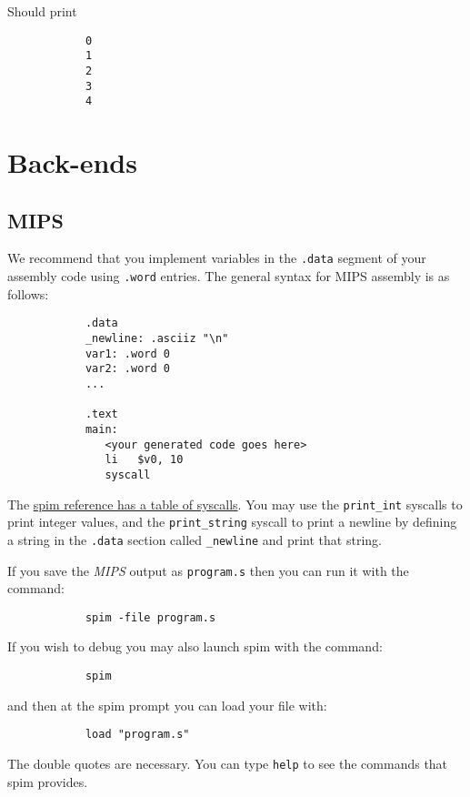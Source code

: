 \documentclass{article}
\newcommand{\code}[1]{\texttt{\textmd{#1}}}
\begin{document}
		Should print

		\begin{lstlisting}
			0
			1
			2
			3
			4
		\end{lstlisting}
	
\section{Back-ends}	
	
	\subsection{MIPS}

		We recommend that you implement variables in the \code{.data} segment of your assembly code using \code{.word} entries. The
		general syntax for MIPS assembly is as follows:

		\begin{lstlisting}
			.data
			_newline: .asciiz "\n"
			var1: .word 0
			var2: .word 0
			...
			
			.text
			main:
			   <your generated code goes here>
			   li   $v0, 10
			   syscall
		\end{lstlisting}
		
		The \href{https://www.cs.tcd.ie/\string~waldroj/itral/spim_ref.html}{spim reference has a table of syscalls}.
		You may use the \texttt{print\_int} syscalls to print integer values, and the \texttt{print\_string} syscall to
		print a newline by defining a string in the \texttt{.data} section called \texttt{\_newline} and print that
		string.
		
		If you save the \textit{MIPS} output as \code{program.s} then you can run it with the command:
		
		\begin{lstlisting}
			spim -file program.s
		\end{lstlisting}
		
		If you wish to debug you may also launch spim with the command:
		
		\begin{lstlisting}
			spim
		\end{lstlisting}
		
		and then at the spim prompt you can load your file with:
		
		\begin{lstlisting}
			load "program.s"
		\end{lstlisting}

		The double quotes are necessary. You can type \texttt{help} to see the commands that spim provides.
	
\end{document}
